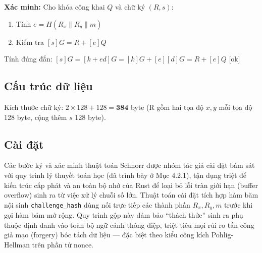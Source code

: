 \textbf{Xác minh:} Cho khóa công khai \(Q\) và chữ ký \((R, s)\):

\begin{enumerate}
\def\labelenumi{\arabic{enumi}.}
\tightlist
\item
  Tính \(e = H(R_x \| R_y \| m)\)
\item
  Kiểm tra \([s]G = R + [e]Q\)
\end{enumerate}

Tính đúng đắn: \([s]G = [k + ed]G = [k]G + [e][d]G = R + [e]Q\) {[}ok{]}

\subsection{Cấu trúc dữ liệu}\label{cux1ea5u-truxfac-dux1eef-liux1ec7u}

\begin{Shaded}
\begin{Highlighting}[]
 \OperatorTok{\textless{}}\OperatorTok{:}\OperatorTok{\textgreater{}} \OperatorTok{\{}
    \OperatorTok{:}\OperatorTok{\textless{}}\OperatorTok{\textgreater{},}  
    \OperatorTok{:}\OperatorTok{,}           
\OperatorTok{\}}
\end{Highlighting}
\end{Shaded}

\label{lst:ch4_schnorr}\vspace{12pt}

Kích thước chữ ký: \(2 \times 128 + 128 = \mathbf{384}\) byte (R gồm hai
tọa độ \(x, y\) mỗi tọa độ 128 byte, cộng thêm \(s\) 128 byte).

\subsection{Cài đặt}\label{cuxe0i-ux111ux1eb7t}

Các bước ký và xác minh thuật toán Schnorr được nhóm tác giả cài đặt bám
sát với quy trình lý thuyết toán học (đã trình bày ở Mục 4.2.1), tận
dụng triệt để kiến trúc cấp phát và an toàn bộ nhớ của Rust để loại bỏ
lỗi tràn giới hạn (buffer overflow) sinh ra từ việc xử lý chuỗi số lớn.
Thuật toán cài đặt tích hợp hàm băm nội sinh \texttt{challenge\_hash}
dùng nối trực tiếp các thành phần \(R_x, R_y, m\) trước khi gọi hàm băm
mở rộng. Quy trình gộp này đảm bảo ``thách thức'' sinh ra phụ thuộc định
danh vào toàn bộ ngữ cảnh thông điệp, triệt tiêu mọi rủi ro tấn công giả
mạo (forgery) bóc tách dữ liệu --- đặc biệt theo kiểu công kích
Pohlig-Hellman trên phần tử nonce.

